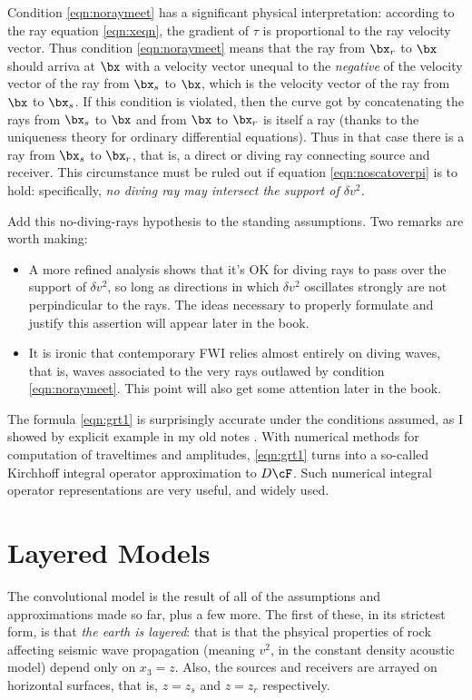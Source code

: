 Condition \ref{eqn:noraymeet} has a significant physical interpretation: according to the ray equation \ref{eqn:xeqn}, the gradient of $\tau$ is proportional to the ray velocity vector. Thus condition \ref{eqn:noraymeet} means that the ray from $\bx_r$ to $\bx$ should arriva at $\bx$ with a velocity vector unequal to the {\em negative} of the velocity vector of the ray from $\bx_s$ to $\bx$, which is the velocity vector of the ray from $\bx$ to $\bx_s$. If this condition is violated, then the curve got by concatenating the rays from $\bx_s$ to $\bx$ and from $\bx$ to $\bx_r$ is itself a ray (thanks to the uniqueness theory for ordinary differential equations). Thus in that case there is a ray from $\bx_s$ to $\bx_r$, that is, a direct or diving ray connecting source and receiver. This circumstance must be ruled out if equation \ref{eqn:noscatoverpi} is to hold: specifically, {\em no diving ray may intersect the support of $\delta v^2$.}  

Add this no-diving-rays hypothesis to the standing assumptions. Two remarks are worth making:
\begin{itemize}
\item A more refined analysis shows that it's OK for diving rays to pass over the support of $\delta v^2$, so long as directions in which $\delta v^2$ oscillates strongly are not perpindicular to the rays. The ideas necessary to properly formulate and justify this assertion will appear later in the book.
\item It is ironic that contemporary FWI relies almost entirely on diving waves, that is, waves associated to the very rays outlawed by condition \ref{eqn:noraymeet}. This point will also get some attention later in the book.
\end{itemize}

The formula \ref{eqn:grt1} is surprisingly accurate under the conditions assumed, as I showed by explicit example in my old notes \cite[]{SymesNotes}. With numerical methods for computation of traveltimes and amplitudes, \ref{eqn:grt1} turns into a so-called Kirchhoff integral operator approximation to $D\cF$. Such numerical integral operator representations are very useful, and widely used.

\section{Layered Models}
The convolutional model is the result of all of the assumptions and approximations made so far, plus a few more. The first of these, in its strictest form, is that {\em the earth is layered}: that is that the phsyical properties of rock affecting seismic wave propagation (meaning $v^2$, in the constant density acoustic model) depend only on $x_3=z$. Also, the sources and receivers are arrayed on horizontal surfaces, that is, $z = z_s$ and $z=z_r$ respectively. 

